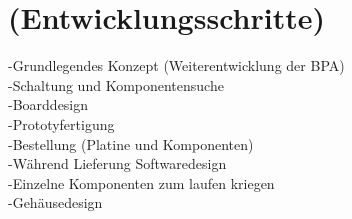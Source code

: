 
\newpage
\section{(Entwicklungsschritte)}

-Grundlegendes Konzept (Weiterentwicklung der BPA)\\
-Schaltung und Komponentensuche\\
-Boarddesign\\
-Prototyfertigung\\
-Bestellung (Platine und Komponenten)\\
-Während Lieferung Softwaredesign\\
-Einzelne Komponenten zum laufen kriegen\\
-Gehäusedesign\\

